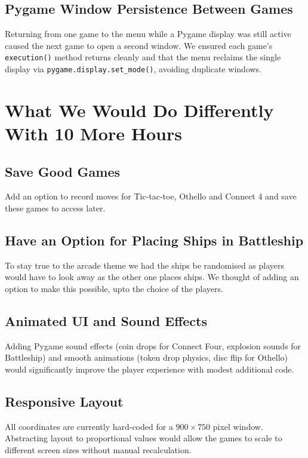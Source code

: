 \documentclass[12pt,a4paper]{article}
\begin{document}
\subsection{Pygame Window Persistence Between Games}
Returning from one game to the menu while a Pygame display was still active caused the next
game to open a second window. We ensured each game's \texttt{execution()} method returns
cleanly and that the menu reclaims the single display via \texttt{pygame.display.set\_mode()},
avoiding duplicate windows.

\newpage
\section{What We Would Do Differently With 10 More Hours}

\subsection{Save Good Games}
Add an option to record moves for Tic-tac-toe, Othello and Connect 4 and save these games to access later.

\subsection{Have an Option for Placing Ships in Battleship}
To stay true to the arcade theme we had the ships be randomised as players would have to look away as the other one places ships. We thought of adding an option to make this possible, upto the choice of the players.

\subsection{Animated UI and Sound Effects}
Adding Pygame sound effects (coin drops for Connect Four, explosion sounds for Battleship) and
smooth animations (token drop physics, disc flip for Othello) would significantly improve the
player experience with modest additional code.

\subsection{Responsive Layout}
All coordinates are currently hard-coded for a $900 \times 750$ pixel window. Abstracting
layout to proportional values would allow the games to scale to different screen sizes without
manual recalculation.
\end{document}
